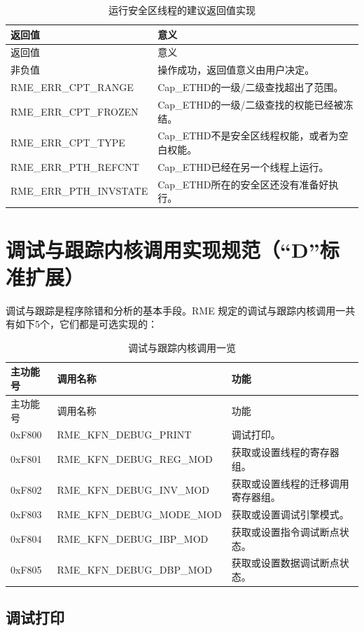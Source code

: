 \begin{xltabular}{\textwidth}{@{}>{\hsize\raggedright\arraybackslash}X>{\hsize\raggedright\arraybackslash}X@{}}
\caption{运行安全区线程的建议返回值实现}\label{tab:8-107-run-enclave-thread-suggested-return-values}\\
\toprule
返回值 & 意义\tabularnewline
\endfirsthead
\toprule
返回值 & 意义\tabularnewline
\midrule
\endhead
\bottomrule
\endlastfoot
    非负值 & 操作成功，返回值意义由用户决定。\tabularnewline
    RME\_ERR\_CPT\_RANGE & Cap\_ETHD的一级/二级查找超出了范围。\tabularnewline
    RME\_ERR\_CPT\_FROZEN & Cap\_ETHD的一级/二级查找的权能已经被冻结。\tabularnewline
    RME\_ERR\_CPT\_TYPE & Cap\_ETHD不是安全区线程权能，或者为空白权能。\tabularnewline
    RME\_ERR\_PTH\_REFCNT & Cap\_ETHD已经在另一个线程上运行。\tabularnewline
    RME\_ERR\_PTH\_INVSTATE & Cap\_ETHD所在的安全区还没有准备好执行。\tabularnewline
\end{xltabular}

\section{调试与跟踪内核调用实现规范（``D''标准扩展）}\label{sec:8-debug-and-trace-kernel-calls}
\nopagebreak[4]

调试与跟踪是程序除错和分析的基本手段。RME 规定的调试与跟踪内核调用一共有如下5个，它们都是可选实现的：

\begin{xltabular}{\textwidth}{@{}>{\hsize\raggedright\arraybackslash}X>{\hsize\raggedright\arraybackslash}X>{\hsize\raggedright\arraybackslash}X@{}}
\caption{调试与跟踪内核调用一览}\label{tab:8-108-debug-and-trace-kernel-calls}\\
\toprule
主功能号 & 调用名称 & 功能\tabularnewline
\endfirsthead
\toprule
主功能号 & 调用名称 & 功能\tabularnewline
\midrule
\endhead
\bottomrule
\endlastfoot
0xF800 & RME\_KFN\_DEBUG\_PRINT & 调试打印。\tabularnewline
0xF801 & RME\_KFN\_DEBUG\_REG\_MOD &
获取或设置线程的寄存器组。\tabularnewline
0xF802 & RME\_KFN\_DEBUG\_INV\_MOD &
获取或设置线程的迁移调用寄存器组。\tabularnewline
0xF803 & RME\_KFN\_DEBUG\_MODE\_MOD &
获取或设置调试引擎模式。\tabularnewline
0xF804 & RME\_KFN\_DEBUG\_IBP\_MOD &
获取或设置指令调试断点状态。\tabularnewline
0xF805 & RME\_KFN\_DEBUG\_DBP\_MOD &
获取或设置数据调试断点状态。\tabularnewline
\end{xltabular}

\subsection{调试打印}\label{subsec:8-debug-print}


